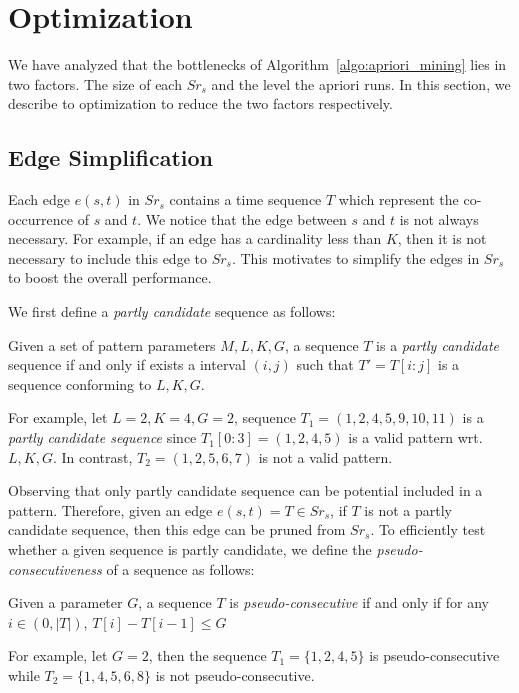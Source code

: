 \section{Optimization}
We have analyzed that the bottlenecks of Algorithm~\ref{algo:apriori_mining} 
lies in two factors. The size of each $Sr_s$ and the level the apriori runs.
In this section, we describe to optimization to reduce the two factors
respectively.

\subsection{Edge Simplification}
Each edge $e(s,t)$ in $Sr_s$ contains a time sequence $T$ 
which represent the co-occurrence of $s$ and $t$. We notice that the edge
between $s$ and $t$ is not always necessary. For example, if an edge has a
cardinality less than $K$, then it is not necessary to include this edge to $Sr_s$.
This motivates to simplify the edges in $Sr_s$ to boost the overall performance.

We first define a \emph{partly candidate} sequence as follows:
\begin{definition}
Given a set of pattern parameters $M,L,K,G$, a sequence $T$ is 
a \emph{partly candidate} sequence if and only if exists a interval $(i,j)$
such that $T'=T[i:j]$ is a sequence conforming to $L,K,G$.
\end{definition}

For example, let $L = 2, K = 4, G = 2$, sequence $T_1=(1,2,4,5,9,10,11)$ 
is a \emph{partly candidate sequence} since $T_1[0:3] = (1,2,4,5)$ is a valid
pattern wrt. $L,K,G$. In contrast, $T_2=(1,2,5,6,7)$ is not a valid pattern.

Observing that only partly candidate sequence can be potential included in a 
pattern. Therefore, given an edge $e(s,t)=T \in Sr_s$, if $T$ is not a partly
candidate sequence, then this edge can be pruned from $Sr_s$. To efficiently
test whether a given sequence is partly candidate, we define the \emph{pseudo-consecutiveness} 
of a sequence as follows:

\begin{definition}
Given a parameter $G$, a sequence $T$ is \emph{pseudo-consecutive} if and only
if for any $i\in (0, |T|)$, $T[i] - T[i-1] \leq G$
\end{definition}

For example, let $G = 2$, then the sequence $T_1=\{1, 2, 4, 5\}$ is pseudo-consecutive
while $T_2=\{1,4,5,6,8\}$ is not pseudo-consecutive. 

